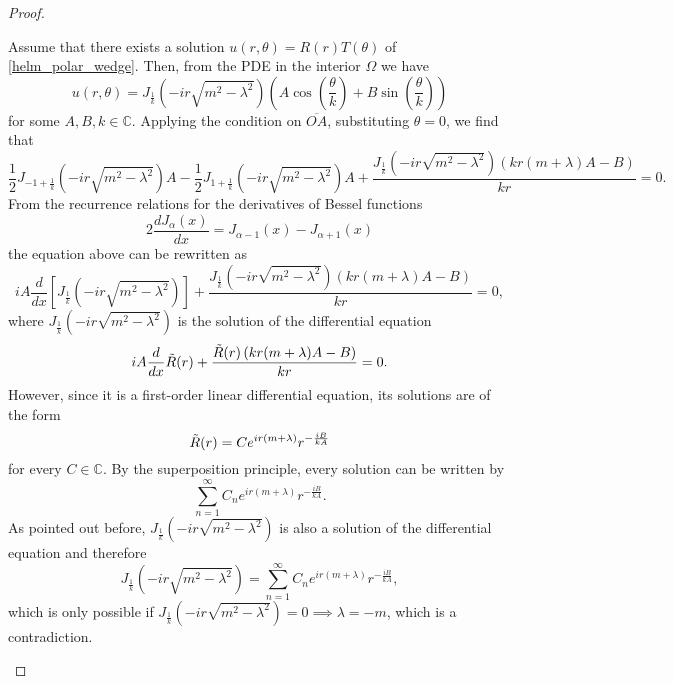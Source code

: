 \begin{proof}
\begin{enumerate}
    Assume that there exists a solution \(u(r, \theta) = R(r) T (\theta)\) of \eqref{helm_polar_wedge}. Then, from the \ac{PDE} in the interior \(\Omega\) we have
    \[
        u(r, \theta) = J_{\frac{1}{k}}\left(-i r \sqrt{m^2-\lambda^2}\right)\left(A \cos(\frac{\theta}{k})+B \sin(\frac{\theta}{k})\right)
    \]
    for some \(A, B, k \in \mathbb{C}\). Applying the condition on \(\overline{OA}\), substituting \(\theta=0\), we find that
    \[
        \frac{1}{2}J_{-1+\frac{1}{k}}\left(-i r \sqrt{m^2-\lambda^2}\right)A - \frac{1}{2}J_{1+\frac{1}{k}}\left(-i r \sqrt{m^2-\lambda^2}\right)A + \frac{J_{\frac{1}{k}}\left(-i r \sqrt{m^2-\lambda^2}\right)\left(k r (m + \lambda)A - B\right)}{k r} = 0.
    \]
    From the recurrence relations for the derivatives of Bessel functions
    \[
        2 \frac{d J_\alpha (x)}{d x} = J_{\alpha-1} (x) - J_{\alpha+1} (x)
    \]
    the equation above can be rewritten as
    \[
        i A \frac{d}{d x}\left[J_{\frac{1}{k}} \left(-i r \sqrt{m^2-\lambda^2}\right)\right] + \frac{J_{\frac{1}{k}}\left(-i r \sqrt{m^2-\lambda^2}\right)\left(k r (m + \lambda)A - B\right)}{k r} = 0,
    \]
    where \(J_{\frac{1}{k}} \left(-i r \sqrt{m^2-\lambda^2}\right)\) is the solution of the differential equation
    \[
        i A \frac{d}{d x}\Tilde{R}(r) + \frac{\Tilde{R}(r) \left(k r (m + \lambda)A - B\right)}{k r} = 0.
    \]
    However, since it is a first-order linear differential equation, its solutions are of the form
    \[
        \Tilde{R}(r) = C e^{i r (m+\lambda)}r^{-\frac{i B}{k A}}
    \]
    for every \(C \in \mathbb{C}\). By the superposition principle, every solution can be written by
    \[
        \sum_{n=1}^{\infty} C_n e^{i r (m+\lambda)}r^{-\frac{i B}{k A}}.
    \]
    As pointed out before, \(J_{\frac{1}{k}} \left(-i r \sqrt{m^2-\lambda^2}\right)\) is also a solution of the differential equation and therefore
    \[
        J_{\frac{1}{k}} \left(-i r \sqrt{m^2-\lambda^2}\right) = \sum_{n=1}^{\infty} C_n e^{i r (m+\lambda)}r^{-\frac{i B}{k A}},
    \]
    which is only possible if \(J_{\frac{1}{k}} \left(-i r \sqrt{m^2-\lambda^2}\right) = 0 \implies \lambda=-m\), which is a contradiction. 


\end{enumerate}
\end{proof}

